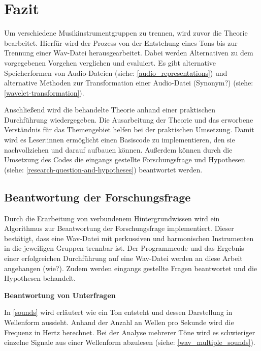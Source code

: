\chapter{Fazit}
%

Um verschiedene Musikinstrumentgruppen zu trennen, wird zuvor die Theorie bearbeitet.
Hierfür wird der Prozess von der Entstehung eines Tons bis zur Trennung einer Wav-Datei herausgearbeitet.
Dabei werden Alternativen zu dem vorgegebenen Vorgehen verglichen und evaluiert.
Es gibt alternative Speicherformen von Audio-Dateien (siehe: \cref{audio_representations}) und alternative Methoden zur Transformation einer Audio-Datei (Synonym?) (siehe: \cref{wavelet-transformation}).

\par

Anschließend wird die behandelte Theorie anhand einer praktischen Durchführung wiedergegeben.
Die Ausarbeitung der Theorie und das erworbene Verständnis für das Themengebiet helfen bei der praktischen Umsetzung.
Damit wird es Leser:innen ermöglicht einen Basiscode zu implementieren, den sie nachvollziehen und darauf aufbauen können.
Außerdem können durch die Umsetzung des Codes die eingangs gestellte Forschungsfrage und Hypothesen (siehe: \cref{research-question-and-hypotheses}) beantwortet werden.

%
\section{Beantwortung der Forschungsfrage}
%

Durch die Erarbeitung von verbundenem Hintergrundwissen wird ein Algorithmus zur Beantwortung der Forschungsfrage implementiert.
Dieser bestätigt, dass eine Wav-Datei mit perkussiven und harmonischen Instrumenten in die jeweiligen Gruppen trennbar ist.
Der Programmcode und das Ergebnis einer erfolgreichen Durchführung auf eine Wav-Datei werden an diese Arbeit angehangen (wie?).
Zudem werden eingangs gestellte Fragen beantwortet und die Hypothesen behandelt.

%
\textbf{Beantwortung von Unterfragen}
%

In \cref{sounds} wird erläutert wie ein Ton entsteht und dessen Darstellung in Wellenform aussieht.
Anhand der Anzahl an Wellen pro Sekunde wird die Frequenz in Hertz berechnet.
Bei der Analyse mehrerer Töne wird es schwieriger einzelne Signale aus einer Wellenform abzulesen (siehe: \cref{wav_multiple_sounds}).

\par

